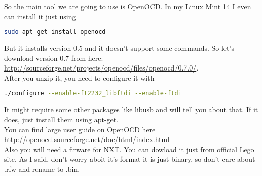 \documentclass[11pt]{article}
\begin{document}
		So the main tool we are going to use is OpenOCD. In my Linux Mint 14 I even can install it just using
		\begin{lstlisting}[language=bash]
sudo apt-get install openocd
		\end{lstlisting}
		But it installs version 0.5 and it doesn't support some commands. So let's download version 0.7 from here: \url{http://sourceforge.net/projects/openocd/files/openocd/0.7.0/}\cite{openocd_project_downloads}.\\
		After you unzip it, you need to configure it with
		\begin{lstlisting}[language=bash]
./configure --enable-ft2232_libftdi --enable-ftdi
		\end{lstlisting}
		It might require some other packages like libusb and will tell you about that. If it does, just install them using apt-get.\\
		You can find large user guide on OpenOCD here \url{http://openocd.sourceforge.net/doc/html/index.html}\cite{openocd_users_guide}\\
		Also you will need a firware for NXT. You can dowload it just from official Lego site. As I said, don't worry aboit it's format it is just binary, so don't care about .rfw and rename to .bin.
\end{document}
